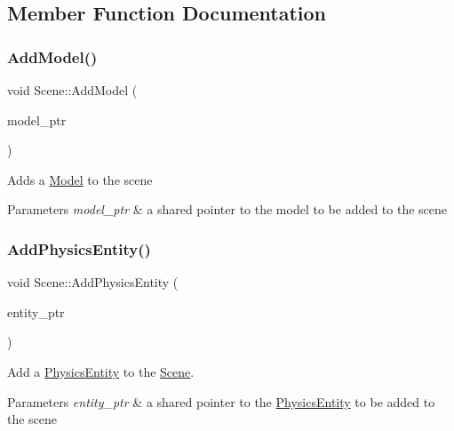 \subsection{Member Function Documentation}
\mbox{\label{classScene_a5419dc941ee6efc29cd5cef8e7d6d414}} 
\subsubsection{\texorpdfstring{Add\+Model()}{AddModel()}}
{\footnotesize\ttfamily void Scene\+::\+Add\+Model (\begin{DoxyParamCaption}\item[{std\+::shared\+\_\+ptr$<$ \hyperlink{classModel}{Model} $>$}]{model\+\_\+ptr }\end{DoxyParamCaption})}

Adds a \hyperlink{classModel}{Model} to the scene 
\begin{DoxyParams}{Parameters}
{\em model\+\_\+ptr} & a shared pointer to the model to be added to the scene \\
\hline
\end{DoxyParams}
\mbox{\label{classScene_a18477e2b5b504b46f3e7d37908abb98d}} 
\subsubsection{\texorpdfstring{Add\+Physics\+Entity()}{AddPhysicsEntity()}}
{\footnotesize\ttfamily void Scene\+::\+Add\+Physics\+Entity (\begin{DoxyParamCaption}\item[{std\+::shared\+\_\+ptr$<$ \hyperlink{classPhysicsEntity}{Physics\+Entity} $>$}]{entity\+\_\+ptr }\end{DoxyParamCaption})}

Add a \hyperlink{classPhysicsEntity}{Physics\+Entity} to the \hyperlink{classScene}{Scene}. 
\begin{DoxyParams}{Parameters}
{\em entity\+\_\+ptr} & a shared pointer to the \hyperlink{classPhysicsEntity}{Physics\+Entity} to be added to the scene \\
\hline
\end{DoxyParams}
\mbox{\label{classScene_a830078c354d5df8ef9b811dac7b2c7dd}} 
